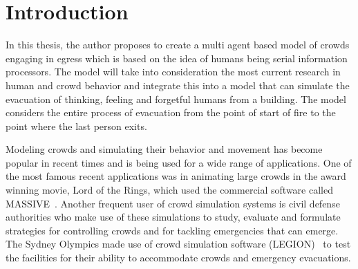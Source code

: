 
\chapter{Introduction}
\label{chapter:Introduction}




In this thesis, the author proposes to create a multi agent based model of crowds engaging in egress which is based on the idea of humans being serial information processors. The model will take into consideration the most current research in human and crowd behavior and integrate this into a model that can simulate the evacuation of thinking, feeling and forgetful humans from a building. The model considers the entire process of evacuation from the point of start of fire to the point where the last person exits. 

Modeling crowds and simulating their behavior and movement has become popular in recent times and is being used for a wide range of applications. One of the most famous recent applications was in animating large crowds in the award winning movie, Lord of the Rings, which used the commercial software called MASSIVE~\cite{Regelous:2011vt}. Another frequent user of crowd simulation systems is civil defense authorities who make use of these simulations to study, evaluate and formulate strategies for controlling crowds and for tackling emergencies that can emerge. The Sydney Olympics made use of crowd simulation software (LEGION)~\cite{Still:2000tp} to test the facilities for their ability to accommodate crowds and emergency evacuations. 

